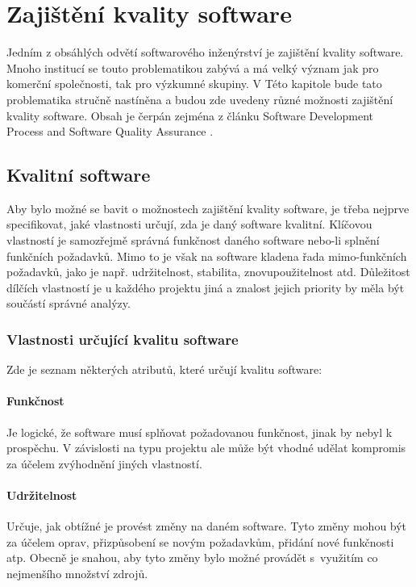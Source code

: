 \chapter{Zajištění kvality software}
	Jedním z obsáhlých odvětí softwarového inženýrství je zajištění kvality software. Mnoho institucí se touto problematikou zabývá a má velký význam jak pro komerční společnosti, tak pro výzkumné skupiny. V Této kapitole bude tato problematika stručně nastíněna a budou zde uvedeny různé možnosti zajištění kvality software. Obsah je čerpán zejména z článku Software Development Process and Software Quality Assurance \cite{swqa}.

\section{Kvalitní software}
	Aby bylo možné se bavit o možnostech zajištění kvality software, je třeba nejprve specifikovat, jaké vlastnosti určují, zda je daný software kvalitní. Klíčovou vlastností je samozřejmě správná funkčnost daného software nebo-li splnění funkčních požadavků. Mimo to je však na software kladena řada mimo-funkčních požadavků, jako je např. udržitelnost, stabilita, znovupoužitelnost atd. Důležitost dílčích vlastností je u každého projektu jiná a znalost jejich priority by měla být součástí správné analýzy.

	\subsection{Vlastnosti určující kvalitu software}
		Zde je seznam některých atributů, které určují kvalitu software:
	
		\subsubsection{Funkčnost}
			Je logické, že software musí splňovat požadovanou funkčnost, jinak by nebyl k prospěchu. V závislosti na typu projektu ale může být vhodné udělat kompromis za účelem zvýhodnění jiných vlastností.	
	
		\subsubsection{Udržitelnost}
			Určuje, jak obtížné je provést změny na daném software. Tyto změny mohou být za účelem oprav, přizpůsobení se novým požadavkům, přidání nové funkčnosti atp. Obecně je snahou, aby tyto změny bylo možné provádět s~využitím co nejmenšího množství zdrojů.
		
